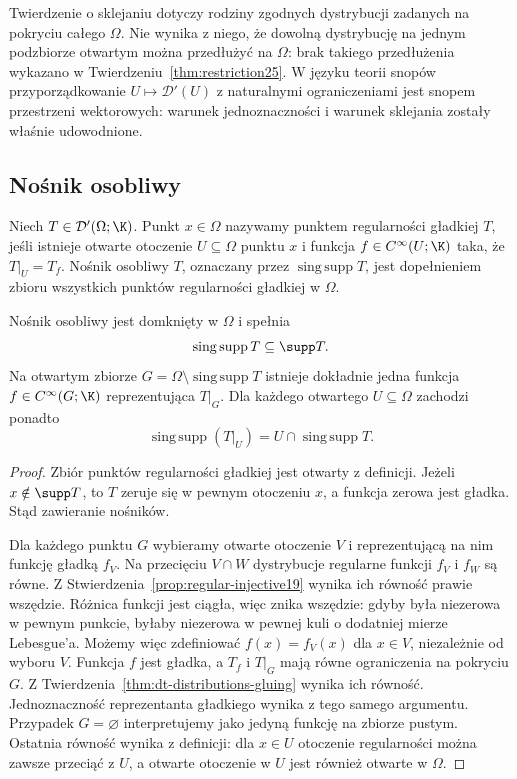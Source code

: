 \begin{uwaga}
\label{rem:dt-gluing-not-extension}
Twierdzenie o sklejaniu dotyczy rodziny zgodnych
dystrybucji zadanych na pokryciu całego $\Omega$.
Nie wynika z niego, że dowolną dystrybucję na jednym
podzbiorze otwartym można przedłużyć na $\Omega$:
brak takiego przedłużenia wykazano w
Twierdzeniu~\ref{thm:restriction25}.
W języku teorii snopów przyporządkowanie
$U\mapsto\mathcal D'(U)$ z naturalnymi ograniczeniami
jest snopem przestrzeni wektorowych: warunek
jednoznaczności i warunek sklejania zostały właśnie
udowodnione.
\end{uwaga}

\subsection{Nośnik osobliwy}

\begin{definicja}
\label{def:dt-singular-support}
Niech $T\in\mathcal D'(\Omega;\K)$. Punkt $x\in\Omega$
nazywamy punktem regularności gładkiej $T$, jeśli
istnieje otwarte otoczenie $U\subseteq\Omega$ punktu $x$
i funkcja $f\in C^\infty(U;\K)$ taka, że
$T|_U=T_f$. Nośnik osobliwy $T$, oznaczany przez
$\operatorname{sing\,supp}T$, jest dopełnieniem zbioru
wszystkich punktów regularności gładkiej w $\Omega$.
\end{definicja}

\begin{stwierdzenie}
\label{prop:dt-singular-support}
Nośnik osobliwy jest domknięty w $\Omega$ i spełnia
\[
 \operatorname{sing\,supp}T\subseteq\supp T.
\]
Na otwartym zbiorze
$G=\Omega\setminus\operatorname{sing\,supp}T$
istnieje dokładnie jedna funkcja $f\in C^\infty(G;\K)$
reprezentująca $T|_G$. Dla każdego otwartego
$U\subseteq\Omega$ zachodzi ponadto
\[
 \operatorname{sing\,supp}(T|_U)
 =U\cap\operatorname{sing\,supp}T.
\]
\end{stwierdzenie}
\begin{proof}
Zbiór punktów regularności gładkiej jest otwarty z definicji.
Jeżeli $x\notin\supp T$, to $T$ zeruje się w pewnym
otoczeniu $x$, a funkcja zerowa jest gładka.
Stąd zawieranie nośników.

Dla każdego punktu $G$ wybieramy otwarte otoczenie
$V$ i reprezentującą na nim funkcję gładką $f_V$.
Na przecięciu $V\cap W$ dystrybucje regularne
funkcji $f_V$ i $f_W$ są równe. Z
Stwierdzenia~\ref{prop:regular-injective19}
wynika ich równość prawie wszędzie. Różnica funkcji
jest ciągła, więc znika wszędzie: gdyby była niezerowa
w pewnym punkcie, byłaby niezerowa w pewnej kuli
o dodatniej mierze Lebesgue'a.
Możemy więc zdefiniować $f(x)=f_V(x)$ dla $x\in V$,
niezależnie od wyboru $V$. Funkcja $f$ jest gładka,
a $T_f$ i $T|_G$ mają równe ograniczenia na pokryciu
$G$. Z Twierdzenia~\ref{thm:dt-distributions-gluing}
wynika ich równość. Jednoznaczność reprezentanta
gładkiego wynika z tego samego argumentu.
Przypadek $G=\varnothing$ interpretujemy jako
jedyną funkcję na zbiorze pustym.
Ostatnia równość wynika z definicji: dla $x\in U$
otoczenie regularności można zawsze przeciąć z $U$,
a otwarte otoczenie w $U$ jest również otwarte w $\Omega$.
\end{proof}

